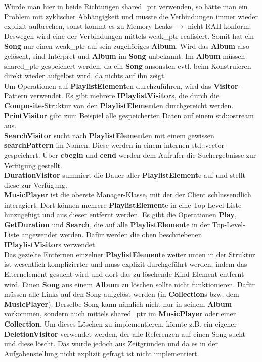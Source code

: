 Würde man hier in beide Richtungen shared\_ptr verwenden, so hätte man ein Problem mit zyklischer Abhängigkeit und müsste die Verbindungen immer wieder explizit aufbrechen, sonst kommt es zu Memory-Leaks $\rightarrow$ nicht RAII-konform.\\

Deswegen wird eine der Verbindungen mittels weak\_ptr realisiert. Somit hat ein \textbf{Song} nur einen weak\_ptr auf sein zugehöriges \textbf{Album}. Wird das \textbf{Album} also gelöscht, sind Interpret und \textbf{Album} im \textbf{Song} unbekannt. Im \textbf{Album} müssen shared\_ptr gespeichert werden, da ein \textbf{Song} ansonsten evtl. beim Konstruieren direkt wieder aufgelöst wird, da nichts auf ihn zeigt.\\

Um Operationen auf \textbf{PlaylistElement}en durchzuführen, wird das \textbf{Visitor}-Pattern verwendet. Es gibt mehrere \textbf{IPlaylistVisitor}s, die durch die \textbf{Composite}-Struktur von den \textbf{PlaylistElement}en durchgereicht werden.\\

\textbf{PrintVisitor} gibt zum Beispiel alle gespeicherten Daten auf einem std::ostream aus.\\
\textbf{SearchVisitor} sucht nach \textbf{PlaylistElement}en mit einem gewissen \textbf{searchPattern} im Namen. Diese werden in einem internen std::vector gespeichert. Über \textbf{cbegin} und \textbf{cend} werden dem Aufrufer die Suchergebnisse zur Verfügung gestellt.\\
\textbf{DurationVisitor} summiert die Dauer aller \textbf{PlaylistElement}e auf und stellt diese zur Verfügung.\\

\textbf{MusicPlayer} ist die oberste Manager-Klasse, mit der der Client schlussendlich interagiert. Dort können mehrere \textbf{PlaylistElement}e in eine Top-Level-Liste hinzugefügt und aus dieser entfernt werden. Es gibt die Operationen \textbf{Play}, \textbf{GetDuration} und \textbf{Search}, die auf alle \textbf{PlaylistElement}e in der Top-Level-Liste angewendet werden. Dafür werden die oben beschriebenen \textbf{IPlaylistVisitor}s verwendet.\\

Das gezielte Entfernen einzelner \textbf{PlaylistElement}e weiter unten in der Struktur ist wesentlich komplizierter und muss explizit durchgeführt werden, indem das Elternelement gesucht wird und dort das zu löschende Kind-Element entfernt wird. Einen \textbf{Song} aus einem \textbf{Album} zu löschen sollte nicht funktionieren. Dafür müssen alle Links auf den Song aufgelöst werden (in \textbf{Collection}s bzw. dem \textbf{MusicPlayer}). Derselbe Song kann nämlich nicht nur in seinem \textbf{Album} vorkommen, sondern auch mittels shared\_ptr im \textbf{MusicPlayer} oder einer \textbf{Collection}. Um dieses Löschen zu implementieren, könnte z.B. ein eigener \textbf{DeletionVisitor} verwendet werden, der alle Referenzen auf einen Song sucht und diese löscht. Das wurde jedoch aus Zeitgründen und da es in der Aufgabenstellung nicht explizit gefragt ist nicht implementiert.\\


